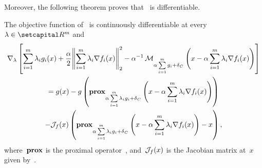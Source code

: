 \documentclass[../../main]{subfiles}
\begin{document}
Moreover, the following theorem proves that~ is differentiable.
\begin{theorem} 
    The objective function of~ is continuously differentiable at every~$\lambda \in \setR^m$ and
    \begin{multline}
        \nabla_\lambda \left[ \sum_{i = 1}^{m} \lambda_i g_i(x) + \frac{\alpha}{2} \norm*{\sum_{i = 1}^{m} \lambda_i \nabla f_i(x)}_2^2 - \alpha^{-1} \envelope_{\alpha \sum\limits_{i = 1}^{m} g_i + \indicator_C}\left( x - \alpha \sum_{i = 1}^{m} \lambda_i \nabla f_i(x) \right)  \right] \\
        = g(x) - g\left( \prox_{\alpha \sum\limits_{i = 1}^{m} \lambda_i g_i + \indicator_C}\left( x - \alpha \sum_{i = 1}^{m} \lambda_i \nabla f_i(x) \right) \right) \\
        - \jdv{f}{x} \left( \prox_{\alpha \sum\limits_{i = 1}^{m} \lambda_i g_i + \indicator_C}\left( x - \alpha \sum_{i = 1}^{m} \lambda_i \nabla f_i(x) \right) - x \right)
        ,\end{multline}
    where~$\operatorname{\mathbf{prox}}$ is the proximal operator~, and~$\mathcal{J}_{f}(x)$ is the Jacobian matrix at~$x$ given by~.
\end{theorem}
\end{document}
